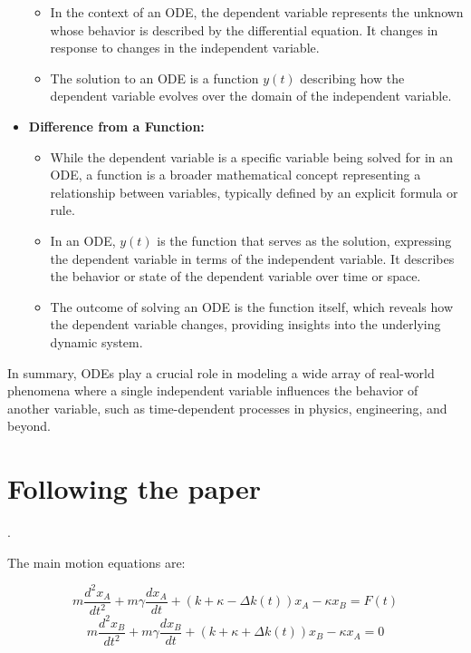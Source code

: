 \begin{airesult}
\begin{itemize}
\begin{itemize}
  \item In the context of an ODE, the dependent variable represents the unknown whose behavior is
described by the differential equation. It changes in response to changes in the independent
variable.

  \item The solution to an ODE is a function \( y(t) \) describing how the dependent variable
evolves over the domain of the independent variable.

  \end{itemize}

\item \textbf{Difference from a Function:}

  \begin{itemize}
  \item While the dependent variable is a specific variable being solved for in an ODE, a function
is a broader mathematical concept representing a relationship between variables, typically defined
by an explicit formula or rule.

  \item In an ODE, \( y(t) \) is the function that serves as the solution, expressing the dependent
variable in terms of the independent variable. It describes the behavior or state of the dependent
variable over time or space.

  \item The outcome of solving an ODE is the function itself, which reveals how the dependent
variable changes, providing insights into the underlying dynamic system.

  \end{itemize}

\end{itemize}

\vsp

In summary, ODEs play a crucial role in modeling a wide array of real-world phenomena where a single
independent variable influences the behavior of another variable, such as time-dependent processes
in physics, engineering, and beyond.
\end{airesult}

\section{Following the paper}

.

The main motion equations are:

\[
  m \frac{d^2x_A}{dt^2} + m \gamma \frac{dx_A}{dt} + \left(k + \kappa - \Delta
k(t)\right)x_A
  - \kappa x_B = F(t)
\]
\[
  m \frac{d^2x_B}{dt^2} + m \gamma \frac{dx_B}{dt} + \left(k + \kappa + \Delta
k(t)\right)x_B
  - \kappa x_A = 0
\]

